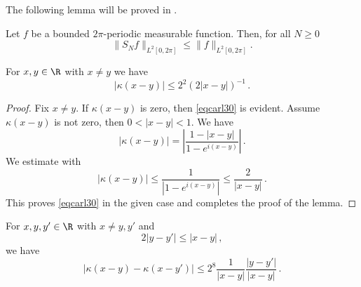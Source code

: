 The following lemma will be proved in .

\begin{lemma}
\label{spectral-projection-bound}
\leanok
{}
    Let $f$ be a bounded $2\pi$-periodic measurable function. Then, for all $N\ge 0$
   \begin{equation}\label{snbound}
   \|S_Nf\|_{L^2[0, 2\pi]} \le \|f\|_{L^2[0, 2\pi]}.
   \end{equation}
\end{lemma}

\begin{lemma}
\label{Hilbert-kernel-bound}
\leanok
{}
    For $x,y\in \R$ with $x\neq y$ we have
    \begin{equation}\label{eqcarl30}
        |\kappa(x-y)|\le 2^2(2|x-y|)^{-1}\, .
    \end{equation}
\end{lemma}
\begin{proof}
\leanok
    Fix $x\neq y$. If $\kappa(x-y)$ is zero, then \eqref{eqcarl30} is evident. Assume $\kappa(x-y)$ is not zero, then $0<|x-y|<1$.
    We have
\begin{equation}\label{eqcarl31}
|\kappa(x-y)|=\left|\frac {1-|x-y|}{1-e^{i(x-y)}}\right|\, .
\end{equation}
We estimate
with 
\begin{equation}\label{eqcarl311}
|\kappa(x-y)|\le \frac {1}{|1-e^{i(x-y)}|}\le \frac 2{|x-y|}\, .
\end{equation}
This proves \eqref{eqcarl30} in the given case and completes the proof of the lemma.
\end{proof}

\begin{lemma}
\label{Hilbert-kernel-regularity}
\leanok
{}
    For $x,y,y'\in \R$ with $x\neq y,y'$ and
    \begin{equation}
        \label{eq-close-hoelder}
        2|y-y'|\le |x-y|\, ,
    \end{equation}
    we have
    \begin{equation}\label{eqcarl301}
        |\kappa(x-y) - \kappa(x-y')|\le 2^{8}\frac{1}{|x-y|} \frac{|y-y'|}{|x-y|}\, .
    \end{equation}
\end{lemma}

